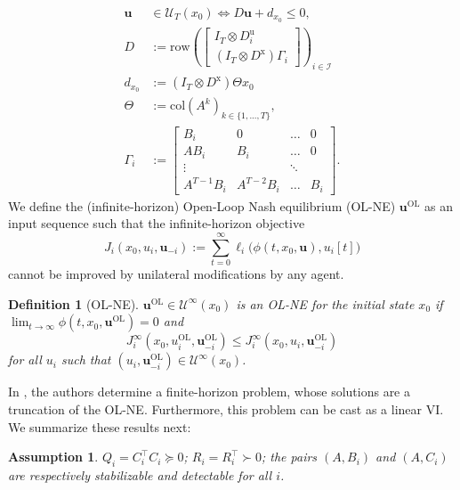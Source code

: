 \documentclass[letterpaper, 10 pt, conference]{ieeeconf}  %
\newcommand{\mc}{\mathcal}
\newcommand{\bs}{\boldsymbol}
\newcommand{\col}{\mathrm{col}}
\newcommand{\buol}{\boldsymbol{u}^{\mathrm{OL}}}
\newcommand{\uol}{u^{\mathrm{OL}}}
\newcommand{\bu}{\boldsymbol{u}}
\newcommand{\Dx}{D^{\text{x}}}
\newcommand{\Du}{D^{\text{u}}}
\newcommand{\row}{\mathrm{row}}
\newtheorem{definition}[theorem]{Definition}
\newtheorem{assumption}[theorem]{Assumption}
\begin{document}
\begin{align}
    \bu&\in\mc U_T(x_0) \iff D\bu + d_{x_0} \leq 0, \label{def-constraint1}\\ 
    D &:= 
        \row\left(\begin{bmatrix}
            I_T \otimes \Du_i \\
            (I_T\otimes\Dx)\Gamma_i
        \end{bmatrix}\right)_{i\in\mc I} \label{def-constraint2}\\ 
    d_{x_0} &:= (I_T\otimes \Dx)\Theta x_0 \label{def-constraint3}\\
    \Theta &:= \col(A^k)_{k\in\{1,...,T\}}, \label{def-constraint4}\\
    \Gamma_i &:= \begin{bmatrix}
            B_i & 0 & \dots & 0 \\
            A B_i & B_i & \dots & 0 \\
            \vdots &  & \ddots & \\
            A^{T-1}B_i & A^{T-2}B_i & \dots  &B_i
        \end{bmatrix}. \label{def-constraint5}
\end{align}
We define the (infinite-horizon) Open-Loop Nash equilibrium (OL-NE) $\buol$ as an input sequence such that the infinite-horizon objective
\begin{equation}
    J_i(x_0, u_i, \bs{u}_{-i}):= \sum_{t=0}^{\infty} \ell_i\big(\phi(t,x_0,\bu),u_i[t]\big)
\end{equation}
cannot be improved by unilateral modifications by any agent. 
\begin{definition}[OL-NE] $\buol\in\mc{U}^{\infty}(x_0)$ is an OL-NE for the initial state $x_0$ if $\lim_{t\xrightarrow{}\infty} \phi(t,x_0,\buol)=0$ and
    \begin{equation}
        J_i^\infty(x_0, \uol_i, \buol_{-i})\leq J_i^\infty(x_0, u_i, \buol_{-i})
    \end{equation}
    for all $u_i$ such that $(u_i, \buol_{-i})\in\mc{U}^\infty(x_0)$.
\end{definition}
In \cite{benenati2024linear}, the authors determine a finite-horizon problem, whose solutions are a truncation of the OL-NE. Furthermore, this problem can be cast as a linear VI. We summarize these results next:
\begin{assumption} \label{as:objective_system}$Q_i=C_i^{\top}C_i \succeq 0$; $R_i = R_i^{\top}\succ 0$; the pairs $(A,B_i)$ and $(A,C_i)$ are respectively stabilizable and detectable for all $i$.
\end{assumption}
\end{document}
